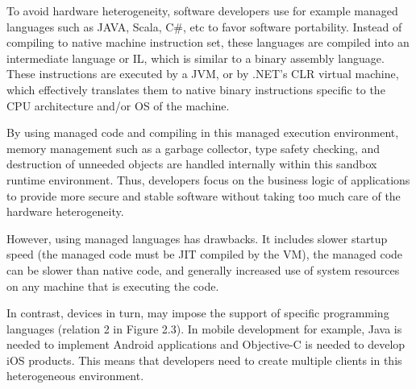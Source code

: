 To avoid hardware heterogeneity, software developers use for example managed languages such as JAVA, Scala, C\#, etc to favor software portability. Instead of compiling to native machine instruction set, these languages are compiled into an intermediate language or IL, which is similar to a binary assembly language. These instructions are executed by a JVM, or by .NET's CLR virtual machine, which effectively translates them to native binary instructions specific to the CPU architecture and/or OS of the machine.

By using managed code and compiling in this managed execution environment, memory management such as a garbage collector, type safety checking, and destruction of unneeded objects are handled internally within this sandbox runtime environment. Thus, developers focus on the business logic of applications to provide more secure and stable software without taking too much care of the hardware heterogeneity.

However, using managed languages has drawbacks. It includes slower startup speed (the managed code must be JIT compiled by the VM), the managed code can be slower than native code, and generally increased use of system resources on any machine that is executing the code.

In contrast, devices in turn, may impose the support of specific programming languages (relation 2 in Figure 2.3). In mobile development for example, Java is needed to implement Android applications and Objective-C is needed to develop iOS products. This means that developers need to create multiple clients in this heterogeneous environment. 



